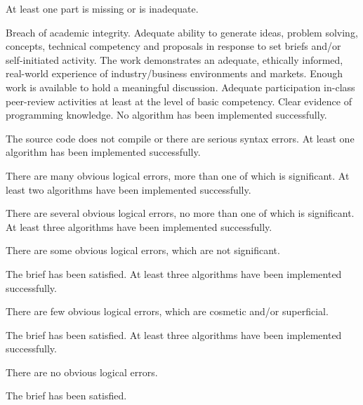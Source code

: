 \documentclass{../../fal_assignment}
\begin{document}
\begin{markingrubric}
%
        \grade \fail At least one part is missing or is inadequate.
                   \par Breach of academic integrity.
        \grade Adequate ability to generate ideas, problem solving, concepts, technical competency and proposals in response to set briefs and/or self-initiated activity.
        \grade  The work demonstrates an adequate, ethically informed, real-world experience of industry/business environments and markets.
        \grade Enough work is available to hold a meaningful discussion.
        \grade  Adequate participation in-class peer-review activities at least at the level of basic competency.
        \grade Clear evidence of programming knowledge.
%
        \grade\fail 	No algorithm has been implemented successfully.
            \par 		The source code does not compile or there are serious syntax errors.
        \grade 		At least one algorithm has been  implemented successfully.
            \par 		There are many obvious logical errors, more than one of which is significant.   
        \grade 		At least two algorithms have been  implemented successfully.
            \par 		There are several obvious logical errors, no more than one of which is significant. 
        \grade 		At least three algorithms have been implemented successfully.
            \par 		There are some obvious logical errors, which are not significant. 
            \par		The brief has been satisfied.
        \grade 		At least three algorithms have been  implemented successfully.
            \par 		There are few obvious logical errors, which are cosmetic and/or superficial.
            \par		The brief has been satisfied.     
        \grade 		At least three algorithms have been  implemented successfully.
            \par		There are no obvious logical errors.
            \par		The brief has been satisfied.
%

\end{markingrubric}
\end{document}
